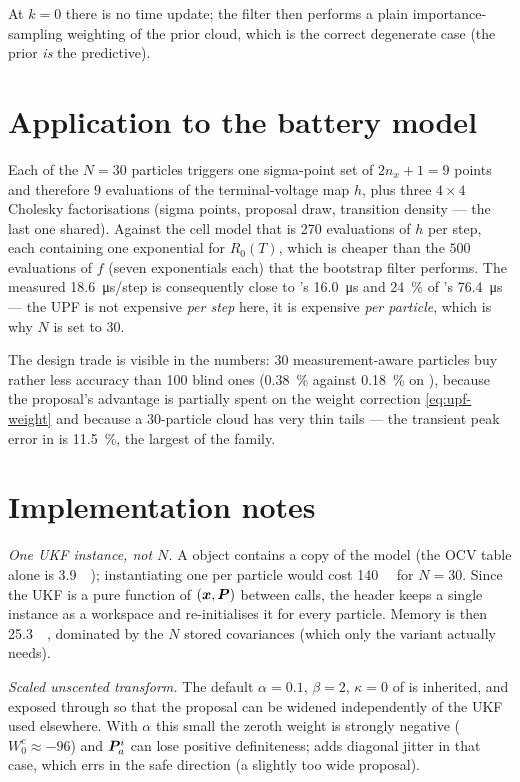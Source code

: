 \noindent At $k=0$ there is no time update; the filter then performs a plain importance-sampling
weighting of the prior cloud, which is the correct degenerate case (the prior \emph{is} the
predictive).

\section{Application to the battery model}
Each of the $N=30$ particles triggers one sigma-point set of $2n_x+1 = 9$ points and therefore
$9$ evaluations of the terminal-voltage map $h$, plus three $4\times4$ Cholesky factorisations
(sigma points, proposal draw, transition density --- the last one shared).  Against the cell model
that is \num{270} evaluations of $h$ per step, each containing one exponential for $R_0(T)$, which
is cheaper than the $500$ evaluations of $f$ (seven exponentials each) that the bootstrap filter
performs.  The measured \SI{18.6}{\micro\second}/step is consequently close to
's \SI{16.0}{\micro\second} and \SI{24}{\percent} of 's
\SI{76.4}{\micro\second} --- the UPF is not expensive \emph{per step} here, it is expensive
\emph{per particle}, which is why $N$ is set to 30.

The design trade is visible in the numbers: 30 measurement-aware particles buy rather less accuracy
than 100 blind ones (\SI{0.38}{\percent} against \SI{0.18}{\percent} on ), because
the proposal's advantage is partially spent on the weight correction \eqref{eq:upf-weight} and
because a 30-particle cloud has very thin tails --- the transient peak error in 
is \SI{11.5}{\percent}, the largest of the family.

\section{Implementation notes}
\emph{One UKF instance, not $N$.}  A  object contains a copy of the model (the OCV
table alone is \SI{3.9}{\kilo\byte}); instantiating one per particle would cost \SI{140}{\kilo\byte}
for $N=30$.  Since the UKF is a pure function of $(\bm{x},\bm{P})$ between calls, the header keeps a
single instance as a workspace and re-initialises it for every particle.  Memory is then
\SI{25.3}{\kilo\byte}, dominated by the $N$ stored covariances (which only the
 variant actually needs).

\emph{Scaled unscented transform.}  The default $\alpha = 0.1$, $\beta = 2$, $\kappa = 0$ of
 is inherited, and exposed through  so that the proposal can be widened
independently of the UKF used elsewhere.  With $\alpha$ this small the zeroth weight is strongly
negative ($W_0^c \approx -96$) and $\bm{P}_a^i$ can lose positive definiteness; 
adds diagonal jitter in that case, which errs in the safe direction (a slightly too wide proposal).

